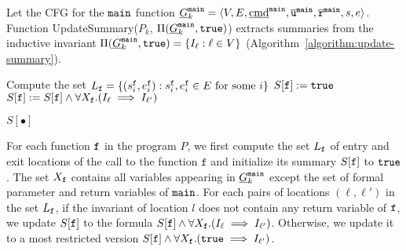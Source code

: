 Let the CFG for the $\mathtt{{main}}$ function $\underline{G}^{\mathtt{{main}}}_k = \langle V, E, \underline{\textmd{cmd}}^{\mathtt{{main}}}, \overline{\mathtt{u}}^{\mathtt{{main}}}, \overline{\mathtt{r}}^{\mathtt{{main}}},s,e \rangle$.
Function 
UpdateSummary($P_k$, $\Pi (\underline{G}^{\mathtt{{main}}}_k, \mathtt{true})$)
extracts summaries from the inductive invariant $\Pi (\underline{G}^{\mathtt{{main}}}_k, \mathtt{true})= \{ I_\ell : \ell \in V
\}$ (Algorithm~\ref{algorithm:update-summary}). 

\begin{algorithm}

  {	
  	Compute the set $L_{\mathtt{{f}}}=\{(s_i^{\mathtt{{f}}},e_i^{\mathtt{{f}}}):s_i^{\mathtt{{f}}}, e_i^{\mathtt{{f}}}\in E\mbox{ for some }i\}$\;
  	$S[\mathtt{{f}}]:=\mathtt{true}$\;
   	{
       	{
         		$S[\mathtt{{f}}]:=S[\mathtt{{f}}]\wedge \forall X_\mathtt{f}. (I_\ell \implies I_{\ell'})$\;
       	}
   	}
    
  }
 
  \Return $S[\bullet]$\;
  \caption{
  $\textmd{UpdateSummary}(P_k, \Pi (\underline{G}^{\fun{main}}_k, \TT))$}
  \label{algorithm:update-summary}
\end{algorithm}

For each function $\mathtt{{f}}$ in the program $P$, we first compute the set $L_{\mathtt{{f}}}$ of entry and exit locations of the call to the function $\mathtt{f}$  and initialize its summary $S[\mathtt{{f}}]$ to $\mathtt{true}$.
The set $X_{\mathtt{{f}}}$ contains all variables appearing in $\underline{G}^{\mathtt{{main}}}_k$ except the set of formal parameter and return variables of $\mathtt{{main}}$.
For each pairs of locations $(\ell,\ell')$ in the set $L_{\mathtt{{f}}}$, if the invariant of location $l$ does not contain any return variable of $\mathtt{{f}}$, we update $S[\mathtt{{f}}]$ to the formula $S[\mathtt{{f}}]\wedge \forall X_{\mathtt{{f}}}. (I_\ell \implies I_{\ell'})$. Otherwise, we update it to a most restricted version $S[\mathtt{{f}}]\wedge \forall X_{\mathtt{{f}}}. (\mathtt{true} \implies I_{\ell'})$.


